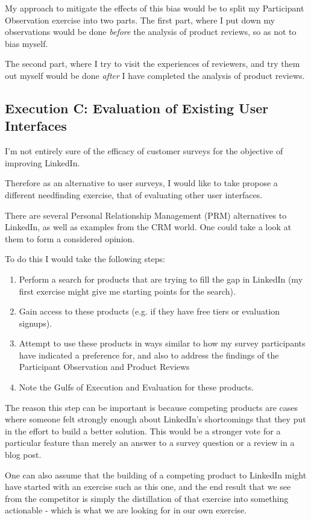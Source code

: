 \documentclass[
	letterpaper, %
]{jdf}
\begin{document}
My approach to mitigate the effects of this bias would be to split my Participant Observation exercise into two parts. The first part, where I put down my observations would be done \textit{before} the analysis of product reviews, so as not to bias myself.

The second part, where I try to visit the experiences of reviewers, and try them out myself would be done \textit{after} I have completed the analysis of product reviews.



\subsection{Execution C: Evaluation of Existing User Interfaces}
I'm not entirely sure of the efficacy of customer surveys for the objective of improving LinkedIn. 

Therefore as an alternative to user surveys, I would like to take propose a different needfinding exercise, that of evaluating other user interfaces.

There are several Personal Relationship Management (PRM) alternatives to LinkedIn, as well as examples from the CRM world. One could take a look at them to form a considered opinion.

To do this I would take the following steps:
\begin{enumerate}
    \item Perform a search for products that are trying to fill the gap in LinkedIn (my first exercise might give me starting points for the search).
    \item Gain access to these products (e.g. if they have free tiers or evaluation signups).
    \item Attempt to use these products in ways similar to how my survey participants have indicated a preference for, and also to address the findings of the Participant Observation and Product Reviews
    \item Note the Gulfs of Execution and Evaluation for these products.
\end{enumerate}

The reason this step can be important is because competing products are cases where someone felt strongly enough about LinkedIn's shortcomings that they put in the effort to build a better solution. This would be a stronger vote for a particular feature than merely an answer to a survey question or a review in a blog post. 

One can also assume that the building of a competing product to LinkedIn might have started with an exercise such as this one, and the end result that we see from the competitor is simply the distillation of that exercise into something actionable - which is what we are looking for in our own exercise.
\end{document}
